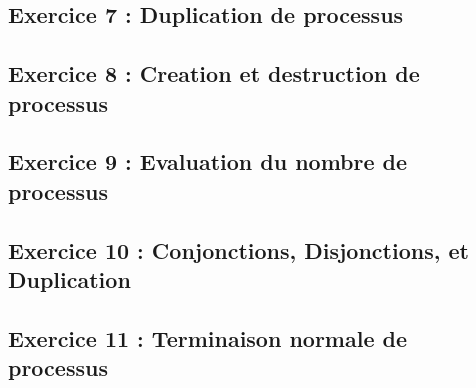 \subsection{Exercice 7 : Duplication de processus}

\subsection{Exercice 8 : Creation et destruction de processus}

\subsection{Exercice 9 : Evaluation du nombre de processus}

\subsection{Exercice 10 : Conjonctions, Disjonctions, et Duplication}

\subsection{Exercice 11 : Terminaison normale de processus}
